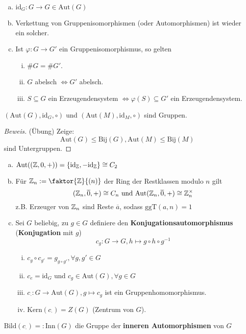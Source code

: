 \documentclass[a4paper]{report}
\begin{document}
\begin{bem}[Übung]
  \begin{enumerate}[(a)]
    \item $\mathrm{id}_{G} : G \to G \in \mathrm{Aut}(G)$
    \item Verkettung von Gruppenisomorphismen (oder Automorphismen) ist wieder ein solcher.
    \item Ist $\varphi : G \to G'$ ein Gruppenisomorphismus, so gelten
          \begin{enumerate}[(i)]
            \item $\#G = \#G'$.
            \item $G$ abelsch $\iff G'$ abelsch.
            \item $S \subseteq G$ ein Erzeugendensystem $\iff \varphi(S) \subseteq G'$ ein Erzeugendensystem.
          \end{enumerate}
  \end{enumerate}
\end{bem}


\begin{prop} $(\mathrm{Aut}(G), \mathrm{id}_{G}, \circ)$ und $(\mathrm{Aut}(M), \mathrm{id}_{M}, \circ)$ sind Gruppen.
  \begin{proof}[Beweis](Übung) Zeige: $$\mathrm{Aut}(G) \le \mathrm{Bij}(G) , \mathrm{Aut}(M) \le \mathrm{Bij}(M)$$
sind Untergruppen.
  \end{proof}
\end{prop}

\begin{bsp}[Übung]\item
  \begin{enumerate}[(a)]
    \item $\mathrm{Aut}((\Bbb Z, 0, +)) = \{\mathrm{id}_{\Bbb Z}, - \mathrm{id}_{\Bbb Z}\} \cong C_{2}$
    \item Für $\Bbb Z_{n}:= \faktor{\Bbb Z}{(n)}$ der Ring der Restklassen modulo $n$ gilt
          $$(\Bbb Z_{n}, \overline 0, +) \cong C_{n} \text{ und } \mathrm{Aut}(\Bbb Z_{n}, \overline 0, +) \cong \Bbb Z_{n}^{\times}$$
          z.B. Erzeuger von $\Bbb Z_{n}$ sind Reste $\overline a$, sodass $\mathrm{ggT}(a,n) = 1$
    \item Sei $G$ beliebig, zu $g \in G$ definiere den \textbf{Konjugationsautomorphismus} (\textbf{Konjugation} mit $g$)
          $$c_{g}: G \to G, h \mapsto g\circ h \circ g^{-1}$$
\begin{enumerate}[(i)]
  \item $c_{g} \circ c_{g'} = g_{g\circ g'}, \forall g, g' \in G$
  \item $c_{e} = \mathrm{id}_{G}$ und $c_{g} \in \mathrm{Aut}(G), \forall g \in G$
  \item $c_{\cdot}: G \to \mathrm{Aut}(G), g \mapsto c_{g}$ ist ein Gruppenhomomorphismus.
  \item $\mathrm{Kern}(c_{\cdot}) = Z(G)$ (Zentrum von $G$).
\end{enumerate}
  \end{enumerate}
\end{bsp}
\begin{bem*}
$\mathrm{Bild}(c_{\cdot}) =: \mathrm{Inn}(G)$ die Gruppe der \textbf{inneren Automorphismen} von $G$
\end{bem*}
\end{document}
